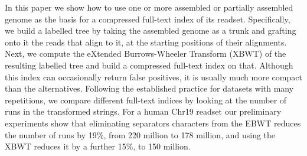 \begin{small}
In this paper we show how to use one or more assembled or partially assembled genome as the basis for a compressed full-text index of its readset.  Specifically, we build a labelled tree by taking the assembled genome as a trunk and grafting onto it the reads that align to it, at the starting positions of their alignments.  Next, we compute the eXtended Burrows-Wheeler Transform (XBWT) of the resulting labelled tree and build a compressed full-text index on that. Although this index can occasionally return false positives, it is usually much more compact than the alternatives.
Following the established practice for datasets with many repetitions, we compare different full-text indices by looking at the number of runs in the transformed strings. For a human Chr19 readset our preliminary experiments show that eliminating separators characters from the EBWT reduces the number of runs by 19\%, from 220 million to 178 million, and using the XBWT reduces it by a further 15\%, to 150 million.

\end{small}





\BiblatexSplitbibDefernumbersWarningOff

\backmatter
{}
\printbibliography[heading=subbibintoc]